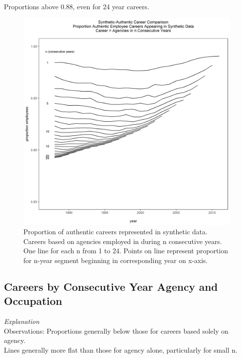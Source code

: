 \documentclass[10pt, letterpaper]{article}
\begin{document}
\begin{spacing}{1.0}
Proportions above 0.88, even for 24 year careers.\\

\begin{figure}[h]
    \centering
    \includegraphics[width=5.25in, trim={0 0 0 0.75in}, clip]{CareerProportionsAgency.png}
    \caption{Proportion of authentic careers represented in synthetic data.  Careers based on agencies employed in during n consecutive years.  One line for each n from 1 to 24.  Points on line represent proportion for n-year segment beginning in corresponding year on x-axis.}
    \label{figure:CareerProportionsAgency}
\end{figure}

\clearpage

\subsection{Careers by Consecutive Year Agency and Occupation}

\textit{Explanation}\\

Observations:  Proportions generally below those for careers based solely on agency.\\

Lines generally more flat than those for agency alone, particularly for small n.\\


\end{spacing}
\end{document}
